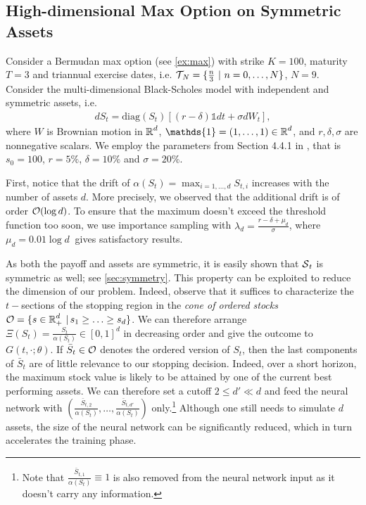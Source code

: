 \subsection{High-dimensional Max Option on Symmetric Assets}\label{sec:maxCallSym}
Consider a Bermudan max option (see \cref{ex:max}) %
with strike $K=100$, maturity $T=3$ and triannual exercise dates, i.e. $\operatorname{\mathcal{T}}_{\! N} = \{\frac{n}{3} \ | \ n=0,\ldots,N\}$, $N=9$.  Consider the multi-dimensional Black-Scholes model with independent and symmetric assets, i.e. 
\begin{align}\label{eq:multiBS}
    d S_t = \text{diag}(S_t) \left[ (r - \delta)\mathds{1} dt + \sigma dW_t\right],
\end{align}
where $W$ is Brownian motion in $\operatorname{\mathbb{R}}^d$, $\mathds{1} = (1,\ldots,1) \in \R^d$, and $r,\delta,\sigma$ are nonnegative scalars. 
We employ the parameters from Section 4.4.1 in \cite{Becker2}, that is $s_0 =100 $, $r=5\%$, $\delta =10\%$ and $\sigma = 20 \%$. 

 First, notice that the drift of $\alpha(S_t) = \max_{i=1,...,d}S_{t,i}$  increases with the number of assets $d$. More precisely, we observed that the additional drift is of order $\operatorname{\mathcal{O}}(\log d)$. To ensure that the maximum doesn't exceed the threshold function too soon, we use importance sampling with $\lambda_d = \frac{r-\delta + \mu_d}{\sigma}$, where $\mu_d = 0.01 \log d\ $ gives satisfactory results. %

As both the payoff and assets are symmetric, it is easily shown that  $\operatorname{\mathcal{S}}_t$ is symmetric as well; see \cref{sec:symmetry}. This property can be exploited to reduce the dimension of our problem. Indeed, observe that it suffices to characterize the $t-$sections of the stopping region in the \textit{cone of ordered stocks}  
 $\operatorname{\mathcal{O}} = \{s\in \operatorname{\mathbb{R}}_+^d \,|\, s_1 \geq \ldots \geq s_d\}$. We can therefore arrange $\Xi(S_t) = \frac{S_t}{\alpha(S_t)}\in [0,1]^d$ in decreasing order and give the outcome to $G(t,\cdot; \theta)$. If $\bar{S}_t \in \operatorname{\mathcal{O}}$ denotes the ordered version of $S_t$, then the last components of $\bar{S}_t$ are of little relevance to our stopping decision. 
 Indeed, over a short horizon, the maximum stock value is likely to be attained by one of the current best performing assets. %
 We can therefore set a cutoff $2 \le d' \ll d$ and feed the neural network with $(\frac{\bar{S}_{t,2}}{\alpha(S_t)},\ldots,\frac{\bar{S}_{t,d'}}{\alpha(S_t)})$ only.\footnote{Note that $\frac{\bar{S}_{t,1}}{\alpha(S_t)} \equiv 1$ is also removed from the neural network input as it doesn't carry any information.} Although one still needs to simulate $d$ assets, the size of the neural network can be significantly reduced, which in turn accelerates the training phase. 
 
